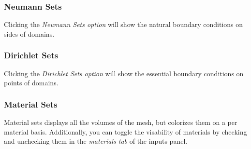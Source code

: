 \subsubsection{Neumann Sets}
Clicking the \emph{Neumann Sets option} will show the natural boundary conditions on sides of domains.

\subsubsection{Dirichlet Sets}
Clicking the \emph{Dirichlet Sets option} will show the essential boundary conditions on points of domains.

\subsubsection{Material Sets}
Material sets displays all the volumes of the mesh, but colorizes them on a per material basis.  Additionally, you can toggle the visability of materials by checking and unchecking them in the \emph{materials tab} of the inputs panel.